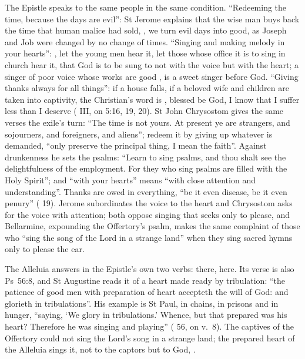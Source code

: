 The Epistle speaks to the same people in the same condition. ``Redeeming the
time, because the days are evil'': St Jerome explains that the wise man buys
back the time that human malice had sold, ,
we turn evil days into good, as Joseph and Job were changed by no change of
times. ``Singing and making melody in your hearts'': , let the young men hear it, let those whose office it
is to sing in church hear it, that God is to be sung to not with the voice but
with the heart; a singer of poor voice whose works are good , is a sweet singer before God. ``Giving thanks always for all
things'': if a house falls, if a beloved wife and children are taken into
captivity, the Christian's word is , blessed be God, I know that I suffer less than I deserve
( III, on 5:16, 19, 20). St John
Chrysostom gives the same verses the exile's turn: ``The time is not yours. At
present ye are strangers, and sojourners, and foreigners, and aliens''; redeem
it by giving up whatever is demanded, ``only preserve the principal thing, I
mean the faith''. Against drunkenness he sets the psalms: ``Learn to sing
psalms, and thou shalt see the delightfulness of the employment. For they who
sing psalms are filled with the Holy Spirit''; and ``with your hearts'' means
``with close attention and understanding''. Thanks are owed in everything, ``be
it even disease, be it even penury'' ( 19). Jerome
subordinates the voice to the heart and Chrysostom asks for the voice with
attention; both oppose singing that seeks only to please, and Bellarmine,
expounding the Offertory's psalm, makes the same complaint of those who ``sing
the song of the Lord in a strange land'' when they sing sacred hymns only to
please the ear.

The Alleluia answers in the Epistle's own two verbs:  there,  here. Its verse is also
Ps~56:8, and St Augustine reads it of a heart made ready by tribulation: ``the
patience of good men with preparation of heart accepteth the will of God: and
glorieth in tribulations''. His example is St Paul, in chains, in prisons and in
hunger, ``saying, `We glory in tribulations.' Whence, but that prepared was his
heart? Therefore he was singing and playing'' (
56, on v.~8). The captives of the Offertory could not sing the Lord's song in a
strange land; the prepared heart of the Alleluia sings it, not to the captors
but to God, .

